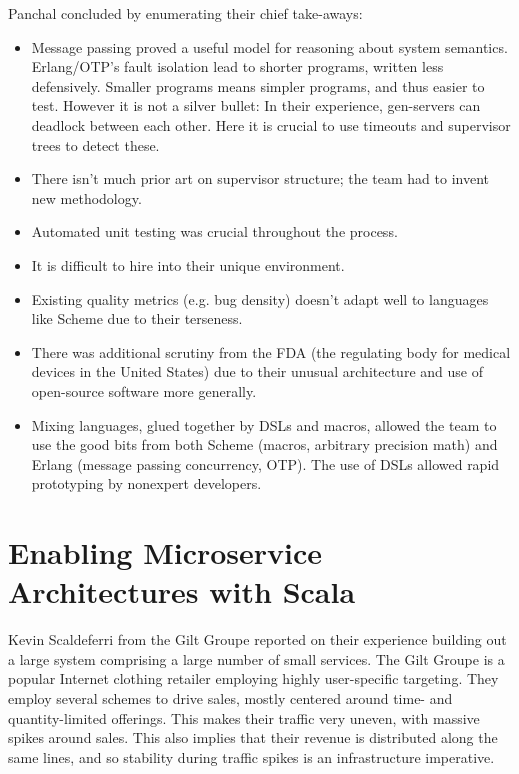\documentclass{jfp1}
\begin{document}
Panchal concluded by enumerating their chief take-aways:

\begin{itemize}

\item Message passing proved a useful model for reasoning about
system semantics. Erlang/OTP's fault isolation lead to shorter
programs, written less defensively. Smaller programs means simpler
programs, and thus easier to test. However it is not a silver bullet:
In their experience, gen-servers can deadlock between each other.
Here it is crucial to use timeouts and supervisor trees to detect
these.

\item There isn't much prior art on supervisor structure; the team
had to invent new methodology.

\item Automated unit testing was crucial throughout the process.

\item It is difficult to hire into their unique environment.

\item Existing quality metrics (e.g. bug density) doesn't adapt well
to languages like Scheme due to their terseness.

\item There was additional scrutiny from the FDA (the regulating body
for medical devices in the United States) due to their unusual
architecture and use of open-source software more generally.

\item Mixing languages, glued together by DSLs and macros, allowed
the team to use the good bits from both Scheme (macros, arbitrary
precision math) and Erlang (message passing concurrency, OTP). The
use of DSLs allowed rapid prototyping by nonexpert developers.


\end{itemize}


\section{Enabling Microservice Architectures with Scala}


Kevin Scaldeferri from the Gilt Groupe reported on their experience
building out a large system comprising a large number of small
services. The Gilt Groupe is a popular Internet clothing retailer
employing highly user-specific targeting. They employ several schemes
to drive sales, mostly centered around time- and quantity-limited
offerings. This makes their traffic very uneven, with massive spikes
around sales. This also implies that their revenue is distributed
along the same lines, and so stability during traffic spikes is an
infrastructure imperative.
\end{document}
